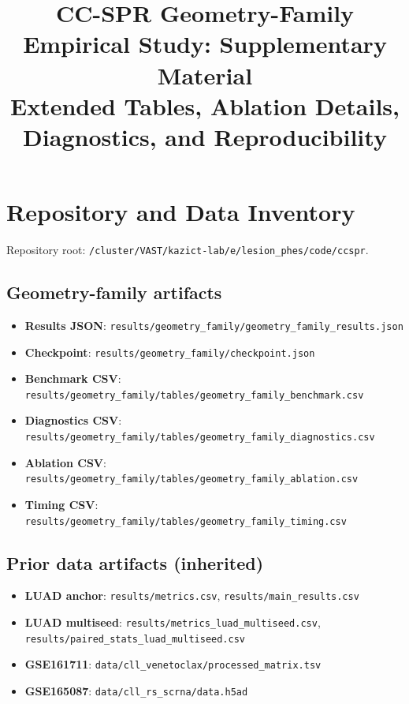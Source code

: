 \documentclass[11pt]{article}
\title{CC-SPR Geometry-Family Empirical Study: Supplementary Material\\[6pt]
\large Extended Tables, Ablation Details, Diagnostics, and Reproducibility}
\author{}
\date{}
\begin{document}
\maketitle

\tableofcontents
\newpage

\section{Repository and Data Inventory}
\label{sec:inventory}

Repository root: \texttt{/cluster/VAST/kazict-lab/e/lesion\_phes/code/ccspr}.

\subsection{Geometry-family artifacts}
\begin{itemize}[leftmargin=1.5em]
\item \textbf{Results JSON}: \texttt{results/geometry\_family/geometry\_family\_results.json}
\item \textbf{Checkpoint}: \texttt{results/geometry\_family/checkpoint.json}
\item \textbf{Benchmark CSV}: \texttt{results/geometry\_family/tables/geometry\_family\_benchmark.csv}
\item \textbf{Diagnostics CSV}: \texttt{results/geometry\_family/tables/geometry\_family\_diagnostics.csv}
\item \textbf{Ablation CSV}: \texttt{results/geometry\_family/tables/geometry\_family\_ablation.csv}
\item \textbf{Timing CSV}: \texttt{results/geometry\_family/tables/geometry\_family\_timing.csv}
\end{itemize}

\subsection{Prior data artifacts (inherited)}
\begin{itemize}[leftmargin=1.5em]
\item \textbf{LUAD anchor}: \texttt{results/metrics.csv}, \texttt{results/main\_results.csv}
\item \textbf{LUAD multiseed}: \texttt{results/metrics\_luad\_multiseed.csv}, \texttt{results/paired\_stats\_luad\_multiseed.csv}
\item \textbf{GSE161711}: \texttt{data/cll\_venetoclax/processed\_matrix.tsv}
\item \textbf{GSE165087}: \texttt{data/cll\_rs\_scrna/data.h5ad}
\end{itemize}
\end{document}
